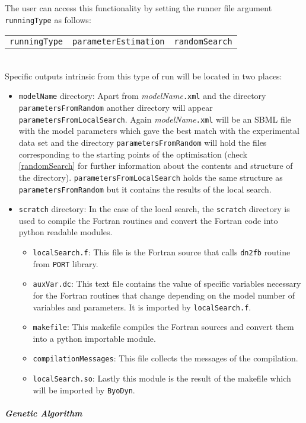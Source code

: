 \documentclass[a4paper, 11pt]{article}
\begin{document}
The user can access this functionality by setting the runner file argument \texttt{runningType} as follows:
\begin{tabular}{ccc}\texttt{runningType}&\texttt{parameterEstimation}&\texttt{randomSearch}\end{tabular}\\[1.5ex]
Specific outputs intrinsic from this type of run will be located in two places:
\begin{itemize}
\item \texttt{modelName} directory:
  Apart from \textit{modelName}\texttt{.xml} and the directory \texttt{parametersFromRandom} another directory will appear \texttt{parametersFromLocalSearch}.
  Again \textit{modelName}\texttt{.xml} will be an SBML file with the model parameters which gave the best match with the experimental data set and the directory \texttt{parametersFromRandom} will hold the files corresponding to the starting points of the optimisation (check \ref{randomSearch} for further information about the contents and structure of the directory).
  \texttt{parametersFromLocalSearch} holds the same structure as \texttt{parametersFromRandom} but it contains the results of the local search.
\item \texttt{scratch} directory:
  In the case of the local search, the \texttt{scratch} directory is used to compile the Fortran routines and convert the Fortran code into python readable modules.
  \begin{itemize}
    \item \texttt{localSearch.f}:
      This file is the Fortran source that calls \texttt{dn2fb} routine from \texttt{PORT} library.
    \item \texttt{auxVar.dc}:
      This text file contains the value of specific variables necessary for the Fortran routines that change depending on the model number of variables and parameters. 
      It is imported by \texttt{localSearch.f}.
    \item \texttt{makefile}:
      This makefile compiles the Fortran sources and convert them into a python importable module.
    \item \texttt{compilationMessages}:
      This file collects the messages of the compilation.
    \item \texttt{localSearch.so}:
      Lastly this module is the result of the makefile which will be imported by \texttt{ByoDyn}.
  \end{itemize}
\end{itemize}
\subparagraph{Genetic Algorithm} \label{ga}
\end{document}

